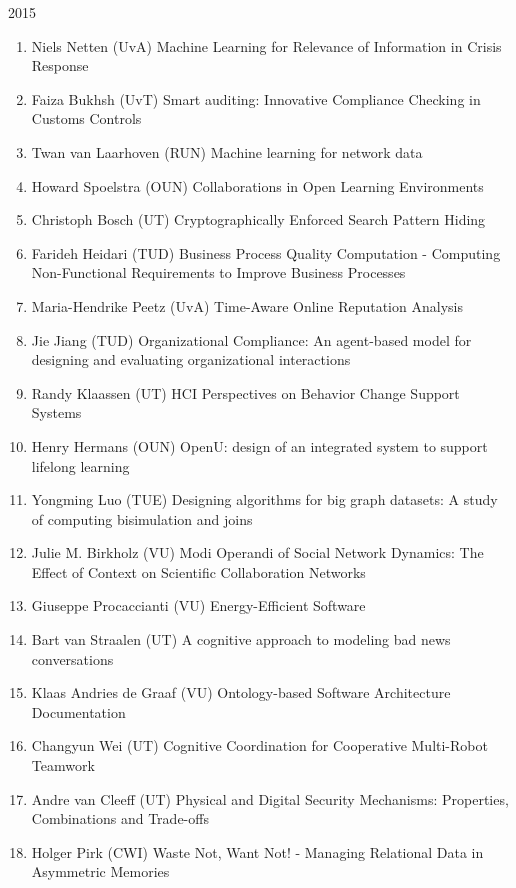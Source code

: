 \begin{multicols}{2}
\begin{scriptsize}
\vspace{0.2cm}
2015	
\vspace{0.2cm}
\begin{enumerate}[leftmargin=*,noitemsep,topsep=0pt,parsep=1pt,partopsep=0pt]
\renewcommand{\labelenumi}{2015-\arabic{enumi}}
\item Niels Netten (UvA) Machine Learning for Relevance of Information in Crisis Response
\item Faiza Bukhsh (UvT) Smart auditing: Innovative Compliance Checking in Customs Controls
\item Twan van Laarhoven (RUN) Machine learning for network data
\item Howard Spoelstra (OUN) Collaborations in Open Learning Environments
\item Christoph Bosch (UT) Cryptographically Enforced Search Pattern Hiding
\item Farideh Heidari (TUD) Business Process Quality Computation - Computing Non-Functional Requirements to Improve Business Processes 
\item Maria-Hendrike Peetz (UvA) Time-Aware Online Reputation Analysis
\item Jie Jiang (TUD) Organizational Compliance: An agent-based model for designing and evaluating organizational interactions 
\item Randy Klaassen (UT) HCI Perspectives on Behavior Change Support Systems
\item Henry Hermans (OUN) OpenU: design of an integrated system to support lifelong learning
\item Yongming Luo (TUE) Designing algorithms for big graph datasets: A study of computing bisimulation and joins
\item Julie M. Birkholz (VU) Modi Operandi of Social Network Dynamics: The Effect of Context on Scientific Collaboration Networks
\item Giuseppe Procaccianti (VU) Energy-Efficient Software
\item Bart van Straalen (UT) A cognitive approach to modeling bad news conversations
\item Klaas Andries de Graaf (VU) Ontology-based Software Architecture Documentation
\item Changyun Wei (UT) Cognitive Coordination for Cooperative Multi-Robot Teamwork
\item Andre van Cleeff (UT) Physical and Digital Security Mechanisms: Properties, Combinations and Trade-offs
\item Holger Pirk (CWI) Waste Not, Want Not! - Managing Relational Data in Asymmetric Memories

\end{enumerate}
\end{scriptsize}
\end{multicols}
